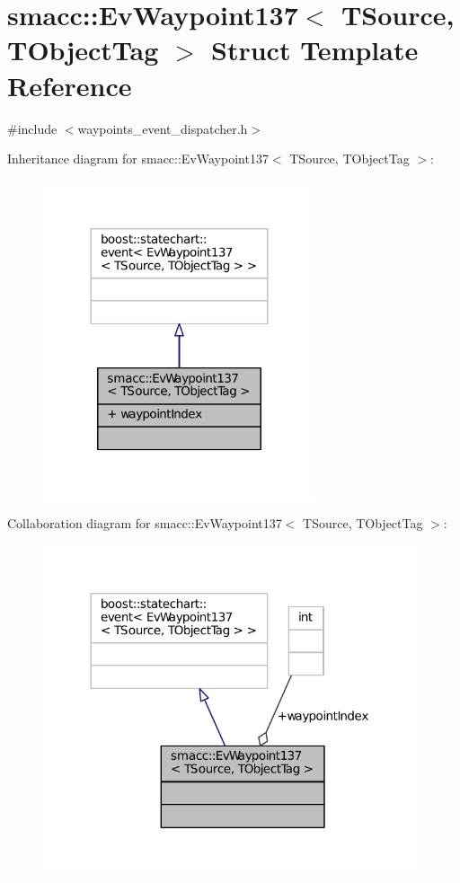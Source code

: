 \hypertarget{structsmacc_1_1EvWaypoint137}{}\section{smacc\+:\+:Ev\+Waypoint137$<$ T\+Source, T\+Object\+Tag $>$ Struct Template Reference}
\label{structsmacc_1_1EvWaypoint137}


{\ttfamily \#include $<$waypoints\+\_\+event\+\_\+dispatcher.\+h$>$}



Inheritance diagram for smacc\+:\+:Ev\+Waypoint137$<$ T\+Source, T\+Object\+Tag $>$\+:
\nopagebreak
\begin{figure}[H]
\begin{center}
\leavevmode
\includegraphics[width=227pt]{structsmacc_1_1EvWaypoint137__inherit__graph}
\end{center}
\end{figure}


Collaboration diagram for smacc\+:\+:Ev\+Waypoint137$<$ T\+Source, T\+Object\+Tag $>$\+:
\nopagebreak
\begin{figure}[H]
\begin{center}
\leavevmode
\includegraphics[width=312pt]{structsmacc_1_1EvWaypoint137__coll__graph}
\end{center}
\end{figure}
